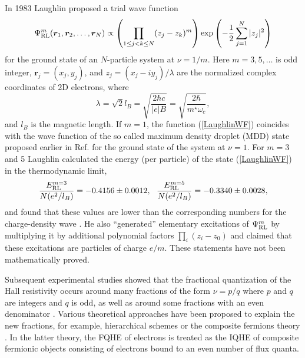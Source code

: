 \documentclass[aps,prb,10pt%
]{revtex4-2}
\def\be{\begin{equation}}
\def\ee{\end{equation}}
\begin{document}
In 1983 Laughlin \cite{Laughlin83} proposed a trial wave function 
\be 
\Psi_{\rm RL}^{m}(\bm r_1,\bm r_2,\dots,\bm r_N)\propto \left(\prod_{1\le j<k\le N} (z_j-z_k)^m \right)\exp\left(-\frac 12\sum_{j=1}^N|z_j|^2\right)
\label{LaughlinWF}
\ee
for the ground state of an $N$-particle system at $\nu=1/m$. Here $m=3,5,\dots$ is odd integer, $\bm r_j=(x_j,y_j)$, and $z_j=(x_j-iy_j)/\lambda$ are the normalized complex coordinates of 2D electrons, where 
\be 
\lambda=\sqrt{2}l_B=\sqrt{\frac{2\hbar c}{|e|B}}=\sqrt{\frac{2\hbar}{m^\star\omega_c}},\label{lambda}
\ee 
and $l_B$ is the magnetic length. If $m=1$, the function (\ref{LaughlinWF}) coincides with the wave function of the so called maximum density droplet (MDD) state proposed earlier in Ref. \cite{Bychkov81} for the ground state of the system at $\nu=1$. For $m=3$ and 5 Laughlin calculated the energy (per particle) of the state (\ref{LaughlinWF}) in the thermodynamic limit,
\be 
\frac{E_{\rm RL}^{m=3}}{N(e^2/l_B)}=-0.4156\pm 0.0012,\ \ 
\frac{E_{\rm RL}^{m=5}}{N(e^2/l_B)}=-0.3340\pm 0.0028, \label{LaughEnergyPP}
\ee 
and found that these values are lower than the corresponding numbers for the charge-density wave \cite{Yoshioka79,Yoshioka83b}. He also ``generated'' elementary excitations of $\Psi_{\rm RL}^{m}$ by multiplying it by additional polynomial factors $\prod_i(z_i-z_0)$ and claimed that these excitations are particles of charge $e/m$. These statements have not been mathematically proved.

Subsequent experimental studies showed that the fractional quantization of the Hall resistivity occurs around many fractions of the form $\nu=p/q$ where $p$ and $q$ are integers and $q$ is odd, as well as around some fractions with an even denominator \cite{Willett87}. Various theoretical approaches have been proposed to explain the new fractions, for example, hierarchical schemes \cite{Haldane83} or the composite fermions theory \cite{Jain89}. In the latter theory, the FQHE of electrons is treated as the IQHE of composite fermionic objects consisting of electrons bound to an even number of flux quanta. %
\end{document}
